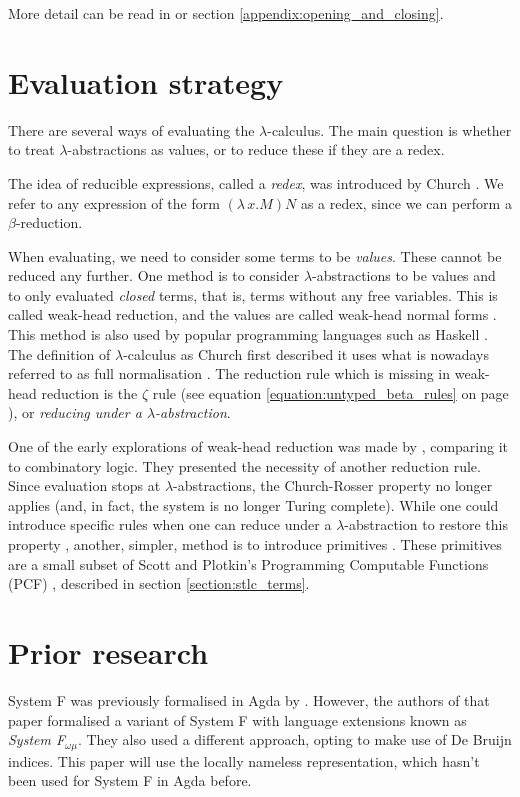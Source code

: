 \documentclass[logo,bsc,singlespacing,parskip,online]{infthesis}
\begin{document}
More detail can be read in \citet{chargueraud_locally_2012} or section
\ref{appendix:opening_and_closing}.

\section{Evaluation strategy}
\label{section:evaluation_strategy}
There are several ways of evaluating the $\lambda$-calculus. The main question is whether to treat
$\lambda$-abstractions as values, or to reduce these if they are a redex.

The idea of reducible expressions, called a \textit{redex}, was introduced by Church
\citet[p.~56]{pierce_types_2002}. We refer to any expression of the form $(\lambda \, x. M) N$ as a
redex, since we can perform a $\beta$-reduction.

When evaluating, we need to consider some terms to be \textit{values}. These cannot be reduced any
further. One method is to consider $\lambda$-abstractions to be values and to only evaluated
\textit{closed} terms, that is, terms without any free variables. This is called weak-head
reduction, and the values are called weak-head normal forms \citep{wadler_programming_2022}. This
method is also used by popular programming languages such as Haskell \citep{hutchison_sharing_2005}.
The definition of $\lambda$-calculus as Church first described it uses what is nowadays referred to
as full normalisation \citep{wadler_programming_2022}. The reduction rule which is missing in
weak-head reduction is the $\zeta$ rule (see equation \ref{equation:untyped_beta_rules} on page
\pageref{equation:untyped_beta_rules}), or \textit{reducing under a $\lambda$-abstraction}.

One of the early explorations of weak-head reduction was made by \citet{cagman_combinatory_1998},
comparing it to combinatory logic. They presented the necessity of another reduction rule. Since
evaluation stops at $\lambda$-abstractions, the Church-Rosser property no longer applies (and, in
fact, the system is no longer Turing complete). While one could introduce specific rules when one
can reduce under a $\lambda$-abstraction to restore this property \citep{hutchison_sharing_2005},
another, simpler, method is to introduce primitives \citep{wadler_programming_2022}. These
primitives are a small subset of Scott and Plotkin's Programming Computable Functions (PCF)
\citep{plotkin_lcf_1977}, described in section \ref{section:stlc_terms}.

\section{Prior research}
System F was previously formalised in Agda by \citet{hutton_system_2019}. However, the authors of
that paper formalised a variant of System F with language extensions known as \textit{System
F$_{\omega \mu}$}. They also used a different approach, opting to make use of De Bruijn indices.
This paper will use the locally nameless representation, which hasn't been used for System F in Agda
before.
\end{document}
